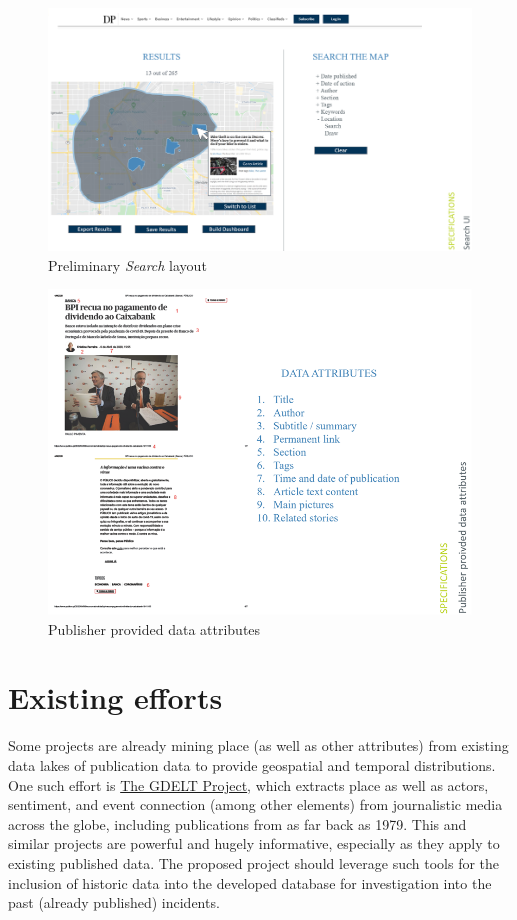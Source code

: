 \begin{figure}[H]
	\centering
	\includegraphics[width=.9\linewidth]{images/search_layout.png}
	\caption{Preliminary \textit{Search} layout}
	\label{fig:search_ui}
\end{figure}

\begin{figure}[H]
	\centering
	\includegraphics[width=.9\linewidth]{images/provided_attributes.png}
	\caption{Publisher provided data attributes}
	\label{fig:publisher_atts}
\end{figure}


\newpage
\section{Existing efforts}\label{appendix:existing_projects}
Some projects are already mining place (as well as other attributes) from existing data lakes of publication data to provide geospatial and temporal distributions. One such effort is \href{https://www.gdeltproject.org/}{The GDELT Project}, which extracts place as well as actors, sentiment, and event connection (among other elements) from journalistic media across the globe, including publications from as far back as 1979. This and similar projects are powerful and hugely informative, especially as they apply to existing published data. The proposed project should leverage such tools for the inclusion of historic data into the developed database for investigation into the past (already published) incidents. 

